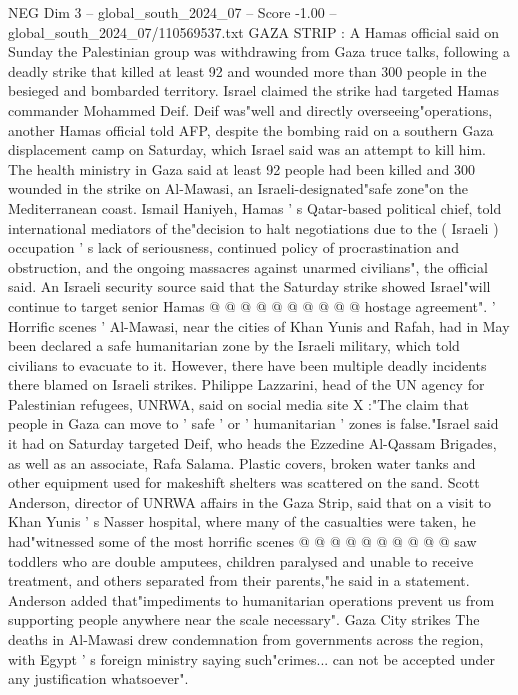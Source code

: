 \begin{textsample}{NEG Dim 3 – global\_south\_2024\_07 – Score -1.00 – global\_south\_2024\_07/110569537.txt}  \label{ex:f3_neg_148}
GAZA STRIP : A Hamas official said on Sunday the Palestinian group was withdrawing from Gaza truce talks, following a deadly strike that killed at least 92 and wounded more than 300 people in the besieged and bombarded territory.
Israel claimed the strike had targeted Hamas commander Mohammed Deif.
Deif was"well and directly overseeing"operations, another Hamas official told AFP, despite the bombing raid on a southern Gaza displacement camp on Saturday, which Israel said was an attempt to kill him.
The health ministry in Gaza said at least 92 people had been killed and 300 wounded in the strike on Al-Mawasi, an Israeli-designated"safe zone"on the Mediterranean coast.
Ismail Haniyeh, Hamas ' s Qatar-based political chief, told international mediators of the"decision to halt negotiations due to the ( Israeli ) occupation ' s lack of seriousness, continued policy of procrastination and obstruction, and the ongoing massacres against unarmed civilians", the official said.
An Israeli security source said that the Saturday strike showed Israel"will continue to target senior Hamas @ @ @ @ @ @ @ @ @ @ hostage agreement". ' Horrific scenes ' Al-Mawasi, near the cities of Khan Yunis and Rafah, had in May been declared a safe humanitarian zone by the Israeli military, which told civilians to evacuate to it.
However, there have been multiple deadly incidents there blamed on Israeli strikes.
Philippe Lazzarini, head of the UN agency for Palestinian refugees, UNRWA, said on social media site X :"The claim that people in Gaza can move to ' safe ' or ' humanitarian ' zones is false."Israel said it had on Saturday targeted Deif, who heads the Ezzedine Al-Qassam Brigades, as well as an associate, Rafa Salama.
Plastic covers, broken water tanks and other equipment used for makeshift shelters was scattered on the sand.
Scott Anderson, director of UNRWA affairs in the Gaza Strip, said that on a visit to Khan Yunis ' s Nasser hospital, where many of the casualties were taken, he had"witnessed some of the most horrific scenes @ @ @ @ @ @ @ @ @ @ saw toddlers who are double amputees, children paralysed and unable to receive treatment, and others separated from their parents,"he said in a statement.
Anderson added that"impediments to humanitarian operations prevent us from supporting people anywhere near the scale necessary".
Gaza City strikes The deaths in Al-Mawasi drew condemnation from governments across the region, with Egypt ' s foreign ministry saying such"crimes... can not be accepted under any justification whatsoever".

\end{textsample}
